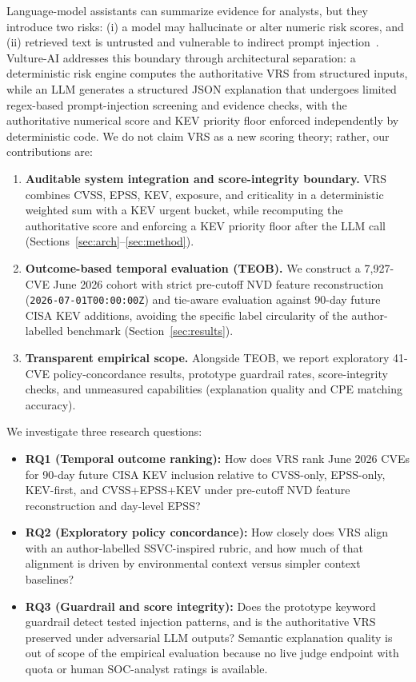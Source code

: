 \documentclass[conference]{IEEEtran}
\begin{document}
Language-model assistants can summarize evidence for analysts, but they introduce two risks: (i) a model may hallucinate or alter numeric risk scores, and (ii) retrieved text is untrusted and vulnerable to indirect prompt injection~\cite{greshake2023indirect}. Vulture-AI addresses this boundary through architectural separation: a deterministic risk engine computes the authoritative VRS from structured inputs, while an LLM generates a structured JSON explanation that undergoes limited regex-based prompt-injection screening and evidence checks, with the authoritative numerical score and KEV priority floor enforced independently by deterministic code. We do not claim VRS as a new scoring theory; rather, our contributions are:
\begin{enumerate}
    \item \textbf{Auditable system integration and score-integrity boundary.} VRS combines CVSS, EPSS, KEV, exposure, and criticality in a deterministic weighted sum with a KEV urgent bucket, while recomputing the authoritative score and enforcing a KEV priority floor after the LLM call (Sections~\ref{sec:arch}--\ref{sec:method}).
    \item \textbf{Outcome-based temporal evaluation (TEOB).} We construct a 7,927-CVE June 2026 cohort with strict pre-cutoff NVD feature reconstruction (\texttt{2026-07-01T00:00:00Z}) and tie-aware evaluation against 90-day future CISA KEV additions, avoiding the specific label circularity of the author-labelled benchmark (Section~\ref{sec:results}).
    \item \textbf{Transparent empirical scope.} Alongside TEOB, we report exploratory 41-CVE policy-concordance results, prototype guardrail rates, score-integrity checks, and unmeasured capabilities (explanation quality and CPE matching accuracy).
\end{enumerate}

We investigate three research questions:
\begin{itemize}
    \item \textbf{RQ1 (Temporal outcome ranking):} How does VRS rank June 2026 CVEs for 90-day future CISA KEV inclusion relative to CVSS-only, EPSS-only, KEV-first, and CVSS+EPSS+KEV under pre-cutoff NVD feature reconstruction and day-level EPSS?
    \item \textbf{RQ2 (Exploratory policy concordance):} How closely does VRS align with an author-labelled SSVC-inspired rubric, and how much of that alignment is driven by environmental context versus simpler context baselines?
    \item \textbf{RQ3 (Guardrail and score integrity):} Does the prototype keyword guardrail detect tested injection patterns, and is the authoritative VRS preserved under adversarial LLM outputs? Semantic explanation quality is out of scope of the empirical evaluation because no live judge endpoint with quota or human SOC-analyst ratings is available.
\end{itemize}
\end{document}
